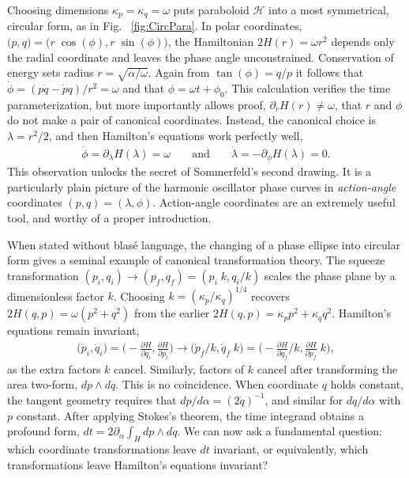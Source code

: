 \documentclass[nofootinbib,preprint]{revtex4-1}
\begin{document}
Choosing dimensions $\kappa_p = \kappa_q=\omega$ puts paraboloid $\mathcal{H}$ into a most 
symmetrical, circular form, as in Fig. ~\ref{fig:CircPara}. In polar coordinates, 
${\big(p,q\big)=\big(r\;\cos(\phi),r \;\sin(\phi)\big)}$,
the Hamiltonian $2H(r)=\omega r^2$ depends only the radial coordinate and leaves the phase angle 
unconstrained. Conservation of energy sets radius $r=\sqrt{\alpha/\omega}$. Again from 
$\tan(\phi) = q/p$ it follows that ${\dot{\phi}=(p \dot{q}-\dot{p}q)/r^2=\omega}$ and that $\phi = \omega t + \phi_0$.
This calculation verifies the time parameterization, but more importantly 
allows proof, $\partial_r H(r) \neq \omega$, that $r$ and $\phi$ do not make a pair of 
canonical coordinates. Instead, the canonical choice is $\lambda = r^2/2$, and then 
Hamilton's equations work perfectly well, 
\begin{eqnarray}
\dot{\phi}=\partial_{\lambda} H(\lambda) = \omega \;\;\;\;\;\;\; 
\text{and} 
\;\;\;\;\;\;\; \dot{\lambda}=-\partial_{\phi} H(\lambda) = 0 . \nonumber
\end{eqnarray}
This observation unlocks the secret of Sommerfeld's second drawing. It is a particularly
plain picture of the harmonic oscillator phase curves in \textit{action-angle}
coordinates $(p,q)=(\lambda,\phi)$. Action-angle coordinates are an extremely useful
tool, and worthy of a proper introduction.

When stated without blas\'{e} language, the changing of a phase ellipse 
into circular form gives a seminal example of canonical transformation theory. The 
squeeze transformation $(p_i,q_i) \rightarrow (p_f,q_f)=(p_i\;k,q_i/k)$ scales the 
phase plane by a dimensionless factor $k$. Choosing $k=(\kappa_p/\kappa_q)^{1/4}$ recovers 
$2H(q,p)=\omega(p^2+q^2)$ from the earlier ${2H(q,p)=\kappa_p p^2+\kappa_q q^2}$. 
Hamilton's equations remain invariant, 
\begin{eqnarray}
\Big(\dot{p}_i,\dot{q}_i\Big) 
= \bigg(-\frac{\partial H }{\partial q_i}, \frac{\partial H}{\partial p_i} \bigg) \nonumber
\longrightarrow
\Big(\dot{p}_f/k,\dot{q}_f\;k\Big) 
= \bigg(-\frac{\partial H }{\partial q_f}/k, \frac{\partial H}{\partial p_f}\;k \bigg),
\end{eqnarray}
as the extra factors $k$ cancel. Similarly, factors of $k$ cancel after transforming
the area two-form, $dp \wedge dq$. This is no coincidence. When coordinate $q$ holds 
constant, the tangent geometry requires that $dp/d\alpha = (2\dot{q})^{-1}$, and similar for 
$dq/d\alpha$ with $p$ constant. After applying Stokes's theorem, the time integrand 
obtains a profound form, $dt=2\partial_{\alpha} \int_H dp\wedge dq$. We can now ask a fundamental
question: which coordinate transformations leave $dt$ invariant, or equivalently, which 
transformations leave Hamilton's equations invariant?
\end{document}
